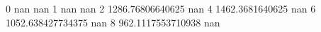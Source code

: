 0 nan nan
1 nan nan
2 1286.76806640625 nan
4 1462.3681640625 nan
6 1052.638427734375 nan
8 962.1117553710938 nan
